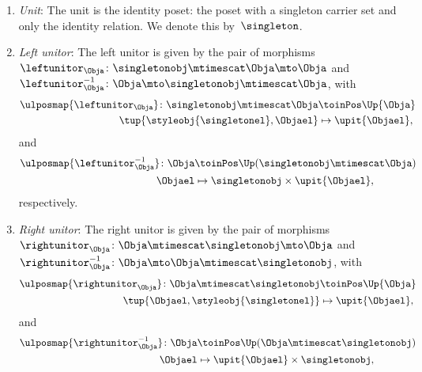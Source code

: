 \begin{lemma}
\begin{enumerate}
        \item \emph{Unit}: The unit is the identity poset: the poset with a singleton carrier set and only the identity relation.
        We denote this by~$\singleton$.
        \item \emph{Left unitor}: The left unitor is given by the pair of morphisms~$\leftunitor_\Obja\colon \singletonobj\mtimescat \Obja \mto \Obja$ and~$\leftunitor_\Obja^{-1}\colon \Obja \mto \singletonobj\mtimescat \Obja$, with
        \begin{equation}
            \begin{aligned}
                \ulposmap{\leftunitor_\Obja}\colon \singletonobj\mtimescat \Obja &\toinPos \Up{\Obja}\\
                \tup{\styleobj{\singletonel},\Objael}&\mapsto \upit\{\Objael\},
            \end{aligned}
        \end{equation}
        and
        \begin{equation}
            \begin{aligned}
                \ulposmap{\leftunitor_\Obja^{-1}}\colon \Obja &\toinPos \Up(\singletonobj\mtimescat \Obja) \\
                \Objael&\mapsto \singletonobj \times \upit \{\Objael\},
            \end{aligned}
        \end{equation}
        respectively.
        \item \emph{Right unitor}: The right unitor is given by the pair of morphisms~$\rightunitor_\Obja\colon \Obja\mtimescat \singletonobj  \mto \Obja$ and~$\rightunitor_\Obja^{-1}\colon \Obja \mto \Obja \mtimescat \singletonobj$, with
        \begin{equation}
            \begin{aligned}
                \ulposmap{\rightunitor_\Obja}\colon \Obja\mtimescat \singletonobj  &\toinPos \Up{\Obja}\\
                \tup{\Objael,\styleobj{\singletonel}}&\mapsto \upit\{\Objael\},
            \end{aligned}
        \end{equation}
        and
        \begin{equation}
            \begin{aligned}
                \ulposmap{\rightunitor_\Obja^{-1}}\colon \Obja &\toinPos \Up( \Obja \mtimescat \singletonobj) \\
                \Objael&\mapsto \upit \{\Objael\} \times \singletonobj,

\end{aligned}
\end{equation}
\end{enumerate}
\end{lemma}
